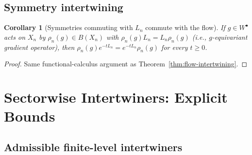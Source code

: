 \documentclass[11pt, a4paper]{amsart}
\newtheorem{corollary}[theorem]{Corollary}
\theoremstyle{definition}
\begin{document}
\subsection{Symmetry intertwining}

\begin{corollary}[Symmetries commuting with $L_n$ commute with the flow]
\label{cor:symmetry-flow}
If $g \in W^\bullet$ acts on $X_n$ by $\rho_n(g) \in B(X_n)$ with
$\rho_n(g) L_n = L_n \rho_n(g)$ (i.e., $g$-equivariant gradient
operator), then $\rho_n(g) e^{-t L_n} = e^{-t L_n} \rho_n(g)$ for
every $t \geq 0$.
\end{corollary}

\begin{proof}
Same functional-calculus argument as
Theorem~\ref{thm:flow-intertwining}.
\end{proof}

\section{Sectorwise Intertwiners: Explicit Bounds}
\label{sec:intertwiners}

\subsection{Admissible finite-level intertwiners}
\end{document}
